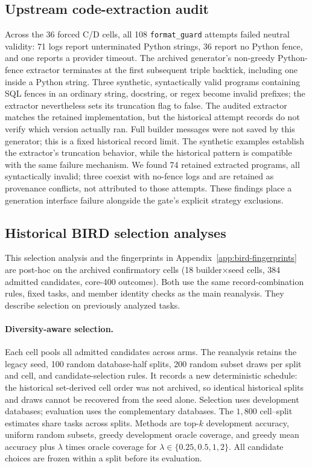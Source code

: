 \subsection{Upstream code-extraction audit}\label{app:extraction}
Across the 36 forced C/D cells, all 108 \texttt{format\_guard} attempts
failed neutral validity: 71 logs report unterminated Python strings,
36 report no Python fence, and one reports a provider timeout.
The archived generator's non-greedy Python-fence extractor terminates at
the first subsequent triple backtick, including one inside a Python
string. Three synthetic, syntactically valid programs containing SQL fences
in an ordinary string, docstring, or regex become invalid prefixes;
the extractor nevertheless sets its truncation flag to false.
The audited extractor matches the retained implementation, but the
historical attempt records do not verify which version actually ran. Full builder messages
were not saved by this generator; this is a fixed historical record
limit. The synthetic examples establish the extractor's truncation
behavior, while the historical pattern is compatible with the same
failure mechanism.
We found 74 retained extracted programs, all syntactically invalid; three
coexist with no-fence logs and are retained as provenance conflicts,
not attributed to those attempts. These findings place a generation
interface failure alongside the gate's explicit strategy exclusions.



\subsection{Historical BIRD selection analyses}\label{app:rich}
This selection analysis and the fingerprints in
Appendix~\ref{app:bird-fingerprints} are post-hoc on the archived confirmatory cells (18
builder$\times$seed cells, 384 admitted candidates, core-400 outcomes).
Both use the same record-combination rules, fixed tasks, and member
identity checks as the main reanalysis. They describe selection on
previously analyzed tasks.

\paragraph{Diversity-aware selection.} Each cell pools all admitted
candidates across arms. The reanalysis retains the legacy seed, 100
random database-half splits, 200 random subset draws per split and cell,
and candidate-selection rules. It records a new deterministic schedule:
the historical set-derived cell order was not archived, so identical
historical splits and draws cannot be recovered from the seed alone.
Selection uses development databases; evaluation uses the complementary
databases. The $1{,}800$ cell--split estimates share tasks across splits.
Methods are top-$k$ development accuracy, uniform random subsets, greedy
development oracle coverage, and greedy mean accuracy plus
$\lambda$ times oracle coverage for $\lambda\in\{0.25,0.5,1,2\}$.
All candidate choices are frozen within a split before its evaluation.

